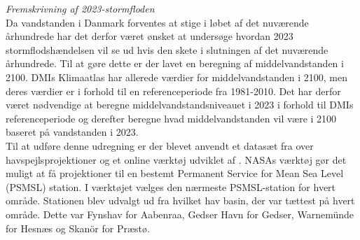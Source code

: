 {\large \textit{Fremskrivning af 2023-stormfloden}} \\
Da vandstanden i Danmark forventes at stige i løbet af det nuværende århundrede har det derfor været ønsket at undersøge hvordan 2023 stormflodshændelsen vil se ud hvis den skete i slutningen af det nuværende århundrede. Til at gøre dette er der lavet en beregning af middelvandstanden i 2100. DMIs Klimaatlas har allerede værdier for middelvandstanden i 2100, men deres værdier er i forhold til en referenceperiode fra 1981-2010. Det har derfor været nødvendige at beregne middelvandstandsniveauet i 2023 i forhold til DMIs referenceperiode og derefter beregne hvad middelvandstanden vil være i 2100 baseret på vandstanden i 2023.\\ 
\newpage
Til at udføre denne udregning er der blevet anvendt et datasæt fra \cite{garner_ipcc_2021} over havspejlsprojektioner og et online værktøj udviklet af \cite{NASA_tool}. NASAs værktøj gør det muligt at få projektioner til en bestemt Permanent Service for Mean Sea Level (PSMSL) station. I værktøjet vælges den nærmeste PSMSL-station for hvert område. Stationen blev udvalgt ud fra hvilket hav basin, der var tættest på hvert område. Dette var Fynshav for Aabenraa, Gedser Havn for Gedser, Warnemünde for Hesnæs og Skanör for Præstø.\\ 

